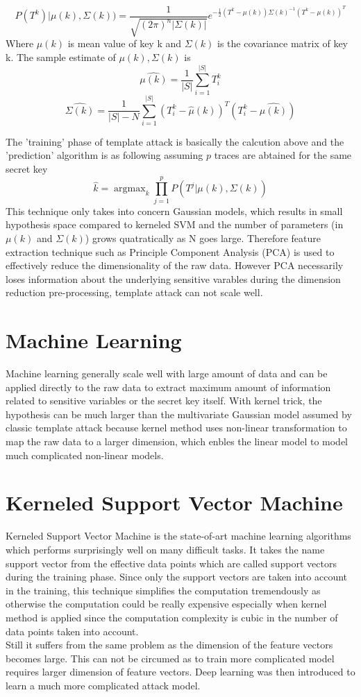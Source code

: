 \documentclass[18]{article}
\DeclareMathOperator*{\argmax}{argmax}
\begin{document}
\[ P(T^k) | \mu (k), \Sigma (k)) = \frac{1}{\sqrt{(2\pi)^n |\Sigma (k) |}} e^{-\frac{1}{2}(T^k-\mu (k)) \Sigma (k)^{-1}(T^k-\mu (k))^T}\]
Where $\mu (k)$ is mean value of key k and $\Sigma (k)$ is the covariance matrix of key k. The sample estimate of $\mu (k), \Sigma (k)$ is
\[\hat{\mu (k)} = \frac{1}{|S|} \sum_{i=1}^{|S|} T_i^k \]
\[\hat{\Sigma (k)} = \frac{1}{|S|-N} \sum_{i=1}^{|S|} (T_i^k-\hat{\mu} (k))^T(T_i^k - \hat{\mu (k)})\]

The 'training' phase of template attack is basically the calcution above and the 'prediction' algorithm is as following assuming $p$ traces are abtained for the same secret key
\[\hat{k} = \argmax_k \prod_{j=1}^{p} P(T^j|\mu (k), \Sigma (k))\]
This technique only takes into concern Gaussian models, which results in small hypothesis space compared to kerneled SVM and the number of parameters (in $\mu (k)$ and $\Sigma (k)$)  grows quatratically as N goes large. Therefore feature extraction technique such as Principle Component Analysis (PCA) is used to effectively reduce the dimensionality of the raw data. However PCA necessarily loses information about the underlying sensitive varables during the dimension reduction pre-processing, template attack can not scale well.

\section{Machine Learning}
Machine learning generally scale well with large amount of data and can be applied directly to the raw data to extract maximum amount of information related to sensitive variables or the secret key itself. With kernel trick, the hypothesis can be much larger than the multivariate Gaussian model assumed by classic template attack because kernel method uses non-linear transformation to map the raw data to a larger dimension, which enbles the linear model to model much complicated non-linear models.

\section{Kerneled Support Vector Machine}
Kerneled Support Vector Machine is the state-of-art machine learning algorithms which performs surprisingly well on many difficult tasks.
It takes the name support vector from the effective data points which are called support vectors during the training phase.
Since only the support vectors are taken into account in the training, this technique simplifies the computation tremendously as otherwise the computation could be really expensive especially when kernel method is applied since the computation complexity is cubic in the number of data points taken into account.\\
Still it suffers from the same problem as the dimension of the feature vectors becomes large. This can not be circumed as to train more complicated model requires larger dimension of feature vectors. Deep learning was then introduced to learn a much more complicated attack model.
\end{document}
